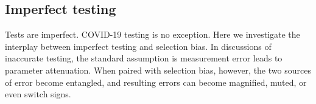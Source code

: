 \documentclass[11pt]{amsart}
\def\I{\bf I}
\begin{document}

\subsection{Imperfect testing}
\label{section:imperfecttesting}

Tests are imperfect.  COVID-19 testing is no exception. Here we investigate the interplay between imperfect testing and selection bias.  In discussions of inaccurate testing, the standard assumption is measurement error leads to parameter attenuation.  When paired with selection bias, however, the two sources of error become entangled, and resulting errors can become magnified, muted, or even switch signs.
\end{document}
